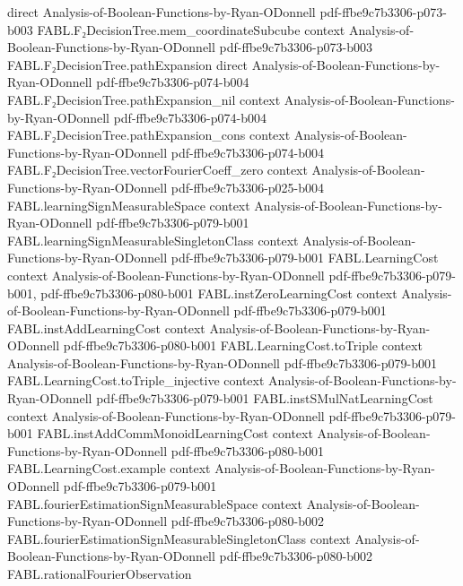 \begin{theorem}
  {direct}
  {Analysis-of-Boolean-Functions-by-Ryan-ODonnell}
  {pdf-ffbe9c7b3306-p073-b003}
\proofstep
  {FABL.F₂DecisionTree.mem_coordinateSubcube}
  {context}
  {Analysis-of-Boolean-Functions-by-Ryan-ODonnell}
  {pdf-ffbe9c7b3306-p073-b003}
\proofstep
  {FABL.F₂DecisionTree.pathExpansion}
  {direct}
  {Analysis-of-Boolean-Functions-by-Ryan-ODonnell}
  {pdf-ffbe9c7b3306-p074-b004}
\proofstep
  {FABL.F₂DecisionTree.pathExpansion_nil}
  {context}
  {Analysis-of-Boolean-Functions-by-Ryan-ODonnell}
  {pdf-ffbe9c7b3306-p074-b004}
\proofstep
  {FABL.F₂DecisionTree.pathExpansion_cons}
  {context}
  {Analysis-of-Boolean-Functions-by-Ryan-ODonnell}
  {pdf-ffbe9c7b3306-p074-b004}
\proofstep
  {FABL.F₂DecisionTree.vectorFourierCoeff_zero}
  {context}
  {Analysis-of-Boolean-Functions-by-Ryan-ODonnell}
  {pdf-ffbe9c7b3306-p025-b004}
\proofstep
  {FABL.learningSignMeasurableSpace}
  {context}
  {Analysis-of-Boolean-Functions-by-Ryan-ODonnell}
  {pdf-ffbe9c7b3306-p079-b001}
\proofstep
  {FABL.learningSignMeasurableSingletonClass}
  {context}
  {Analysis-of-Boolean-Functions-by-Ryan-ODonnell}
  {pdf-ffbe9c7b3306-p079-b001}
\proofstep
  {FABL.LearningCost}
  {context}
  {Analysis-of-Boolean-Functions-by-Ryan-ODonnell}
  {pdf-ffbe9c7b3306-p079-b001,
    pdf-ffbe9c7b3306-p080-b001}
\proofstep
  {FABL.instZeroLearningCost}
  {context}
  {Analysis-of-Boolean-Functions-by-Ryan-ODonnell}
  {pdf-ffbe9c7b3306-p079-b001}
\proofstep
  {FABL.instAddLearningCost}
  {context}
  {Analysis-of-Boolean-Functions-by-Ryan-ODonnell}
  {pdf-ffbe9c7b3306-p080-b001}
\proofstep
  {FABL.LearningCost.toTriple}
  {context}
  {Analysis-of-Boolean-Functions-by-Ryan-ODonnell}
  {pdf-ffbe9c7b3306-p079-b001}
\proofstep
  {FABL.LearningCost.toTriple_injective}
  {context}
  {Analysis-of-Boolean-Functions-by-Ryan-ODonnell}
  {pdf-ffbe9c7b3306-p079-b001}
\proofstep
  {FABL.instSMulNatLearningCost}
  {context}
  {Analysis-of-Boolean-Functions-by-Ryan-ODonnell}
  {pdf-ffbe9c7b3306-p079-b001}
\proofstep
  {FABL.instAddCommMonoidLearningCost}
  {context}
  {Analysis-of-Boolean-Functions-by-Ryan-ODonnell}
  {pdf-ffbe9c7b3306-p080-b001}
\proofstep
  {FABL.LearningCost.example}
  {context}
  {Analysis-of-Boolean-Functions-by-Ryan-ODonnell}
  {pdf-ffbe9c7b3306-p079-b001}
\proofstep
  {FABL.fourierEstimationSignMeasurableSpace}
  {context}
  {Analysis-of-Boolean-Functions-by-Ryan-ODonnell}
  {pdf-ffbe9c7b3306-p080-b002}
\proofstep
  {FABL.fourierEstimationSignMeasurableSingletonClass}
  {context}
  {Analysis-of-Boolean-Functions-by-Ryan-ODonnell}
  {pdf-ffbe9c7b3306-p080-b002}
\proofstep
  {FABL.rationalFourierObservation}

\end{theorem}
